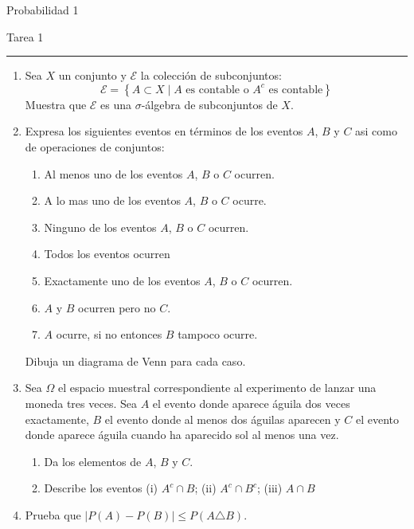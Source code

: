 \documentclass[12pt]{extreport}
\begin{document}
\begin{center}
    \textsf{\Large Probabilidad 1}
    \par\medskip
    \textsf{\large Tarea 1}
    \end{center}
    \hrule
    \par\bigskip

\begin{enumerate}
    \item Sea $X$ un conjunto y $\mathcal{E}$ la colección de subconjuntos:
    $$
    \mathcal{E} = \left\{A\subset X \mid A \text{ es contable o } A^c \text{ es contable}  \right\}
    $$
    Muestra que $\mathcal{E}$ es una $\sigma$-álgebra de subconjuntos de $X$.
    \item Expresa los siguientes eventos en términos de los eventos $A$, $B$ y $C$ asi como de operaciones de conjuntos:
    \begin{enumerate}
        \item Al menos uno de los eventos $A$, $B$ o $C$ ocurren.
        \item A lo mas uno de los eventos $A$, $B$ o $C$ ocurre.
        \item Ninguno de los eventos $A$, $B$ o $C$ ocurren.
        \item Todos los eventos ocurren
        \item Exactamente uno de los eventos $A$, $B$ o $C$ ocurren.
        \item $A$ y $B$ ocurren pero no $C$.
        \item $A$ ocurre, si no entonces $B$ tampoco ocurre.
    \end{enumerate}
    Dibuja un diagrama de Venn para cada caso.
    \item Sea $\Omega$ el espacio muestral correspondiente al experimento de lanzar una moneda tres veces. Sea $A$ el evento donde aparece águila dos veces exactamente, $B$ el evento donde al menos dos águilas aparecen y $C$ el evento donde aparece águila cuando ha aparecido sol al menos una vez.
    \begin{enumerate}
        \item Da los elementos de $A$, $B$ y $C$.
        \item Describe los eventos (i) $A^c\cap B$; (ii) $A^c\cap B^c$; (iii) $A\cap B$
    \end{enumerate}
    \item Prueba que $\left|P(A)-P(B)\right|\leq P(A\triangle B)$.

\end{enumerate}
\end{document}
